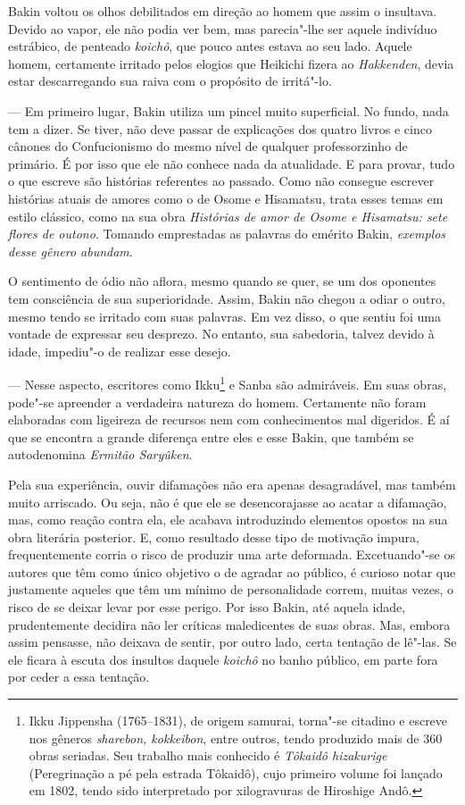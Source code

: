 Bakin voltou os olhos debilitados em direção ao homem que assim o
insultava. Devido ao vapor, ele não podia ver bem, mas parecia"-lhe ser
aquele indivíduo estrábico, de penteado \textit{koichô}, que pouco
antes estava ao seu lado. Aquele homem, certamente irritado pelos
elogios que Heikichi fizera ao \textit{Hakkenden}, devia estar
descarregando sua raiva com o propósito de irritá"-lo.

--- Em primeiro lugar, Bakin utiliza um pincel muito superficial. No
fundo, nada tem a dizer. Se tiver, não deve passar de explicações dos
quatro livros e cinco cânones do Confucionismo do mesmo nível de
qualquer professorzinho de primário. É por isso que ele não conhece
nada da atualidade. E para provar, tudo o que escreve são histórias
referentes ao passado. Como não consegue escrever histórias atuais de
amores como o de Osome e Hisamatsu, trata esses temas em estilo
clássico, como na sua obra \textit{Histórias de amor de Osome e
Hisamatsu: sete flores de outono}. Tomando emprestadas as palavras do
emérito Bakin, \textit{exemplos desse gênero abundam}.

O sentimento de ódio não aflora, mesmo quando se quer, se um dos
oponentes tem consciência de sua superioridade. Assim, Bakin não chegou
a odiar o outro, mesmo tendo se irritado com suas palavras. Em vez
disso, o que sentiu foi uma vontade de expressar seu desprezo. No
entanto, sua sabedoria, talvez devido à idade, impediu"-o de realizar
esse desejo.

--- Nesse aspecto, escritores como Ikku\footnote{ Ikku Jippensha 
(1765--1831), de origem samurai, torna"-se citadino e escreve nos
gêneros \textit{sharebon, kokkeibon}, entre outros, tendo produzido mais de
360 obras seriadas. Seu trabalho mais conhecido é \textit{Tôkaidô hizakurige} 
(Peregrinação a pé pela estrada Tôkaidô), cujo primeiro
volume foi lançado em 1802, tendo sido interpretado por xilogravuras de 
Hiroshige Andô.} e Sanba são admiráveis. Em suas obras, pode"-se
apreender a verdadeira natureza do homem. Certamente não foram
elaboradas com ligeireza de recursos nem com conhecimentos mal
digeridos. É aí que se encontra a grande diferença entre eles e esse
Bakin, que também se autodenomina \textit{Ermitão Saryûken}.

Pela sua experiência, ouvir difamações não era apenas desagradável, mas
também muito arriscado. Ou seja, não é que ele se desencorajasse ao
acatar a difamação, mas, como reação contra ela, ele acabava
introduzindo elementos opostos na sua obra literária posterior. E, como
resultado desse tipo de motivação impura, frequentemente corria o risco
de produzir uma arte deformada. Excetuando"-se os autores que têm como
único objetivo o de agradar ao público, é curioso notar que justamente
aqueles que têm um mínimo de personalidade correm, muitas vezes, o
risco de se deixar levar por esse perigo. Por isso Bakin, até aquela
idade, prudentemente decidira não ler críticas maledicentes de suas
obras. Mas, embora assim pensasse, não deixava de sentir, por outro
lado, certa tentação de lê"-las. Se ele ficara à escuta dos insultos
daquele \textit{koichô} no banho público, em parte fora por ceder a
essa tentação.


